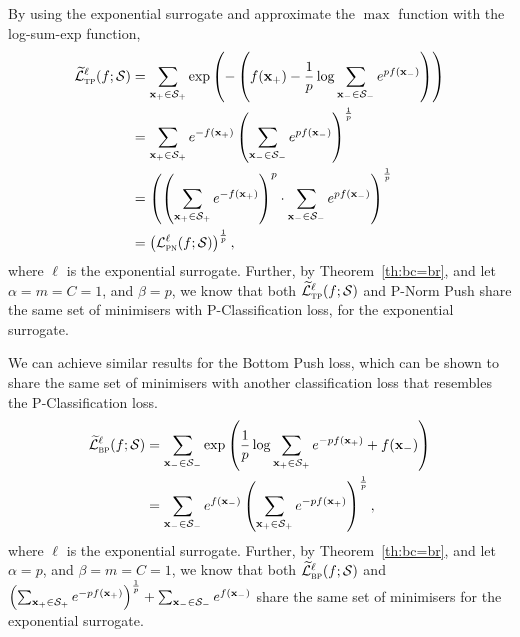 By using the exponential surrogate and approximate the $\max$ function with the log-sum-exp function, \ie
\begin{equation*}
\begin{aligned}
\widetilde{\mathcal{L}}_\textsc{tp}^\ell(f; \mathcal{S})
&= \sum_{\mathbf{x}_+ \in \mathcal{S}_+} \exp \left( - \left( f(\mathbf{x}_+) - \frac{1}{p} \log \sum_{\mathbf{x}_- \in \mathcal{S}_-} e^{p f(\mathbf{x}_-)} \right) \right) \\
&= \sum_{\mathbf{x}_+ \in \mathcal{S}_+} e^{-f(\mathbf{x}_+)} \left( \sum_{\mathbf{x}_- \in \mathcal{S}_-} e^{p f(\mathbf{x}_-)} \right)^\frac{1}{p} \\
&= \left( \left( \sum_{\mathbf{x}_+ \in \mathcal{S}_+} e^{-f(\mathbf{x}_+)} \right)^p \cdot \sum_{\mathbf{x}_- \in \mathcal{S}_-} e^{p f(\mathbf{x}_-)} \right)^\frac{1}{p} \\
&= \left( \mathcal{L}_\textsc{pn}^\ell (f; \mathcal{S}) \right)^\frac{1}{p},
\end{aligned}
\end{equation*}
where $\ell$ is the exponential surrogate.
Further, by Theorem~\ref{th:bc=br}, and let $\alpha = m = C = 1$, and $\beta = p$,
we know that both $\widetilde{\mathcal{L}}_\textsc{tp}^\ell(f; \mathcal{S})$ and P-Norm Push share the same set of minimisers with
P-Classification loss, for the exponential surrogate.

We can achieve similar results for the Bottom Push loss, 
which can be shown to share the same set of minimisers with another classification loss that resembles the P-Classification loss.
\begin{equation*}
\begin{aligned}
\widetilde{\mathcal{L}}_\textsc{bp}^\ell(f; \mathcal{S})
&= \sum_{\mathbf{x}_- \in \mathcal{S}_-} \exp \left( \frac{1}{p} \log \sum_{\mathbf{x}_+ \in \mathcal{S}_+} e^{-p f(\mathbf{x}_+)} + f(\mathbf{x}_-) \right) \\
&= \sum_{\mathbf{x}_- \in \mathcal{S}_-} e^{f(\mathbf{x}_-)} \left( \sum_{\mathbf{x}_+ \in \mathcal{S}_+} e^{-p f(\mathbf{x}_+)} \right)^\frac{1}{p},
\end{aligned}
\end{equation*}
where $\ell$ is the exponential surrogate.
Further, by Theorem~\ref{th:bc=br}, and let $\alpha = p$, and $\beta = m = C = 1$,
we know that both $\widetilde{\mathcal{L}}_\textsc{bp}^\ell(f; \mathcal{S})$ and 
$\left( \sum_{\mathbf{x}_+ \in \mathcal{S}_+} e^{-p f(\mathbf{x}_+)} \right)^\frac{1}{p} + \sum_{\mathbf{x}_- \in \mathcal{S}_-} e^{f(\mathbf{x}_-)}$
share the same set of minimisers for the exponential surrogate.

